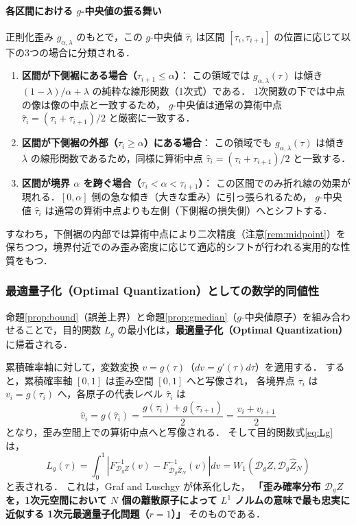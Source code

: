 \documentclass[a4paper,10pt]{jsarticle}
\theoremstyle{definition}
\newcommand{\Wone}{W_1}
\newcommand{\dist}{\mathcal{D}_g}
\begin{document}
\paragraph{各区間における $g$-中央値の振る舞い}
正則化歪み $g_{\alpha,\lambda}$ のもとで，この $g$-中央値 $\hat\tau_i$ は区間 $[\tau_i, \tau_{i+1}]$ の位置に応じて以下の3つの場合に分類される．
\begin{enumerate}
  \item \textbf{区間が下側裾にある場合（$\tau_{i+1} \le \alpha$）}：
  この領域では $g_{\alpha,\lambda}(\tau)$ は傾き $(1-\lambda)/\alpha + \lambda$ の純粋な線形関数（1次式）である．
  1次関数の下では中点の像は像の中点と一致するため，
  $g$-中央値は通常の算術中点 $\hat\tau_i = (\tau_i + \tau_{i+1})/2$ と厳密に一致する．
  \item \textbf{区間が下側裾の外部（$\tau_i \ge \alpha$）にある場合}：
  この領域でも $g_{\alpha,\lambda}(\tau)$ は傾き $\lambda$ の線形関数であるため，同様に算術中点 $\hat\tau_i = (\tau_i + \tau_{i+1})/2$ と一致する．
  \item \textbf{区間が境界 $\alpha$ を跨ぐ場合（$\tau_i < \alpha < \tau_{i+1}$）}：
  この区間でのみ折れ線の効果が現れる．$[0, \alpha]$ 側の急な傾き（大きな重み）に引っ張られるため，
  $g$-中央値 $\hat\tau_i$ は通常の算術中点よりも左側（下側裾の損失側）へとシフトする．
\end{enumerate}
すなわち，下側裾の内部では算術中点により二次精度（注意\ref{rem:midpoint}）を保ちつつ，境界付近でのみ歪み密度に応じて適応的シフトが行われる実用的な性質をもつ．


\subsubsection{最適量子化（Optimal Quantization）としての数学的同値性}
命題\ref{prop:bound}（誤差上界）と命題\ref{prop:gmedian}（$g$-中央値原子）を組み合わせることで，目的関数 $L_g$ の最小化は，\textbf{最適量子化（Optimal Quantization）} \cite{graf2000quantization} に帰着される．

累積確率軸に対して，変数変換 $v = g(\tau)$（$dv = g'(\tau)d\tau$）を適用する．
すると，累積確率軸 $[0, 1]$ は歪み空間 $[0, 1]$ へと写像され，
各境界点 $\tau_i$ は $v_i = g(\tau_i)$ へ，各原子の代表レベル $\hat\tau_i$ は
\begin{equation}
  \hat v_i = g(\hat\tau_i) = \frac{g(\tau_i) + g(\tau_{i+1})}{2} = \frac{v_i + v_{i+1}}{2}
\end{equation}
となり，歪み空間上での算術中点へと写像される．
そして目的関数式\eqref{eq:Lg}は，
\begin{equation}
  L_g(\tau) = \int_0^1 \left| F_{\dist Z}^{-1}(v) - F_{\dist\hat Z_N}^{-1}(v) \right| dv = \Wone(\dist Z, \dist\hat Z_N)
\end{equation}
と表される．
これは，Graf and Luschgy \cite{graf2000quantization} が体系化した，
\textbf{「歪み確率分布 $\dist Z$ を，1次元空間において $N$ 個の離散原子によって $L^1$ ノルムの意味で最も忠実に近似する 1次元最適量子化問題（$r=1$）」}
そのものである．
\end{document}

